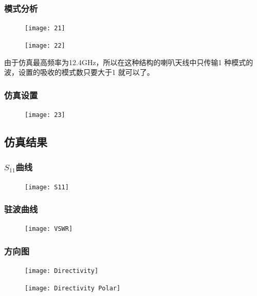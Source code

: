 \documentclass{../source/Experiment}
\begin{document}
            \subsubsection{模式分析}
            \begin{figure}[H]
                \centering
                \texttt{[image: 21]}
                \caption{}
            \end{figure}
            \begin{figure}[H]
                \centering
                \texttt{[image: 22]}
                \caption{}
            \end{figure}
            

            由于仿真最高频率为12.4GHz，所以在这种结构的喇叭天线中只传输1 种模式的波，设置的吸收的模式数只要大于1 就可以了。
            \subsubsection{仿真设置}
            \begin{figure}[H]
                \centering
                \texttt{[image: 23]}
                \caption{}
            \end{figure}
            
        \subsection{仿真结果}

            \subsubsection{$S_{11}$曲线}
            \begin{figure}[H]
                \centering
                \texttt{[image: S11]}
                \caption{}
            \end{figure}
            
            \subsubsection{驻波曲线}
            \begin{figure}[H]
                \centering
                \texttt{[image: VSWR]}
                \caption{}
            \end{figure}
            
            \subsubsection{方向图}
            \begin{figure}[H]
                \centering
                \texttt{[image: Directivity]}
                \caption{}
            \end{figure}
            \begin{figure}[H]
                \centering
                \texttt{[image: Directivity Polar]}
                \caption{}
            \end{figure}
            
\end{document}
